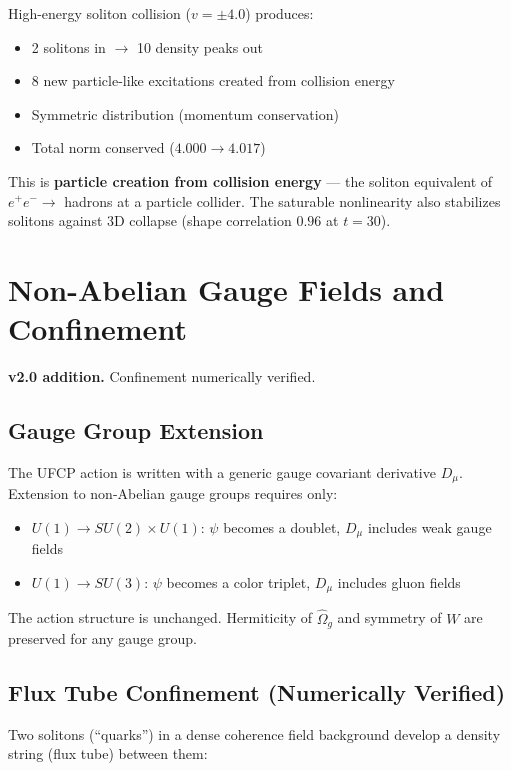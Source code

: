 \documentclass[11pt, a4paper]{article}
\begin{document}
High-energy soliton collision ($v = \pm 4.0$) produces:
\begin{itemize}[nosep]
  \item 2 solitons in $\to$ 10 density peaks out
  \item 8 new particle-like excitations created from collision energy
  \item Symmetric distribution (momentum conservation)
  \item Total norm conserved ($4.000 \to 4.017$)
\end{itemize}

This is \textbf{particle creation from collision energy} --- the
soliton equivalent of $e^+e^- \to$ hadrons at a particle collider.
The saturable nonlinearity also stabilizes solitons against 3D
collapse (shape correlation $0.96$ at $t = 30$).

\section{Non-Abelian Gauge Fields and Confinement}
\label{sec:confinement}

\textbf{v2.0 addition.} Confinement numerically verified.

\subsection{Gauge Group Extension}

The UFCP action is written with a generic gauge covariant derivative
$D_\mu$. Extension to non-Abelian gauge groups requires only:
\begin{itemize}[nosep]
  \item $U(1) \to SU(2) \times U(1)$: $\psi$ becomes a doublet,
        $D_\mu$ includes weak gauge fields
  \item $U(1) \to SU(3)$: $\psi$ becomes a color triplet,
        $D_\mu$ includes gluon fields
\end{itemize}

The action structure is unchanged. Hermiticity of $\hat{\Omega}_g$
and symmetry of $W$ are preserved for any gauge group.

\subsection{Flux Tube Confinement (Numerically Verified)}

Two solitons (``quarks'') in a dense coherence field background
develop a density string (flux tube) between them:
\end{document}
